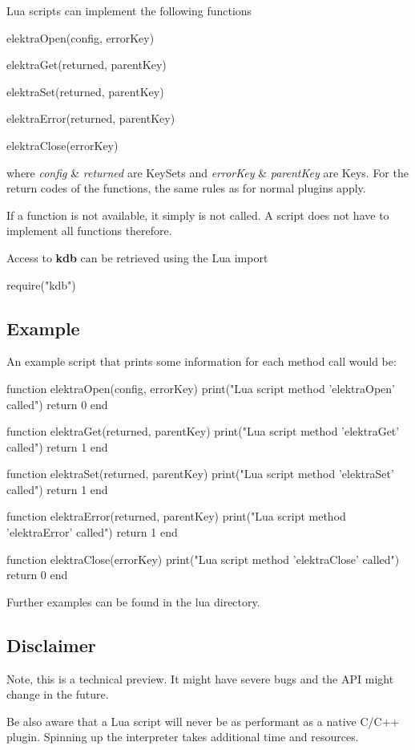 Lua scripts can implement the following functions


\begin{DoxyItemize}
\item elektra\+Open(config, error\+Key)
\item elektra\+Get(returned, parent\+Key)
\item elektra\+Set(returned, parent\+Key)
\item elektra\+Error(returned, parent\+Key)
\item elektra\+Close(error\+Key)
\end{DoxyItemize}

where {\itshape config} \& {\itshape returned} are Key\+Sets and {\itshape error\+Key} \& {\itshape parent\+Key} are Keys. For the return codes of the functions, the same rules as for normal plugins apply.

If a function is not available, it simply is not called. A script does not have to implement all functions therefore.

Access to {\bfseries kdb} can be retrieved using the Lua import


\begin{DoxyCode}
require("kdb")
\end{DoxyCode}


\subsection*{Example}

An example script that prints some information for each method call would be\+:


\begin{DoxyCode}
function elektraOpen(config, errorKey)
  print("Lua script method 'elektraOpen' called")
  return 0
end

function elektraGet(returned, parentKey)
  print("Lua script method 'elektraGet' called")
  return 1
end

function elektraSet(returned, parentKey)
  print("Lua script method 'elektraSet' called")
  return 1
end

function elektraError(returned, parentKey)
  print("Lua script method 'elektraError' called")
  return 1
end

function elektraClose(errorKey)
  print("Lua script method 'elektraClose' called")
  return 0
end
\end{DoxyCode}


Further examples can be found in the lua directory.

\subsection*{Disclaimer}

Note, this is a technical preview. It might have severe bugs and the A\+PI might change in the future.

Be also aware that a Lua script will never be as performant as a native C/\+C++ plugin. Spinning up the interpreter takes additional time and resources. 